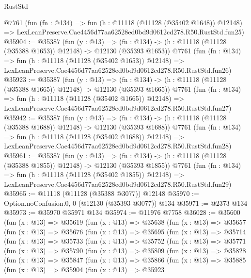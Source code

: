 \begin{lexlean}{RustStd}
\begin{coremodule}
    @7761
    (fun (fn : @134) =>
    fun (h : @11118 (@11128 (@35402 @1648)) @12148) =>
    LexLeanPreserve.Cae4456d77aa62528ed0bd9d0612cd278.R50.RustStd.fun25)
@35904 := @35387
    (fun (y : @13) =>
    (fn : @134) -> (h : @11118 (@11128 (@35388 @1653)) @12148) -> @12130 (@35393 @1653))
    @7761
    (fun (fn : @134) =>
    fun (h : @11118 (@11128 (@35402 @1653)) @12148) =>
    LexLeanPreserve.Cae4456d77aa62528ed0bd9d0612cd278.R50.RustStd.fun26)
@35923 := @35387
    (fun (y : @13) =>
    (fn : @134) -> (h : @11118 (@11128 (@35388 @1665)) @12148) -> @12130 (@35393 @1665))
    @7761
    (fun (fn : @134) =>
    fun (h : @11118 (@11128 (@35402 @1665)) @12148) =>
    LexLeanPreserve.Cae4456d77aa62528ed0bd9d0612cd278.R50.RustStd.fun27)
@35942 := @35387
    (fun (y : @13) =>
    (fn : @134) -> (h : @11118 (@11128 (@35388 @1688)) @12148) -> @12130 (@35393 @1688))
    @7761
    (fun (fn : @134) =>
    fun (h : @11118 (@11128 (@35402 @1688)) @12148) =>
    LexLeanPreserve.Cae4456d77aa62528ed0bd9d0612cd278.R50.RustStd.fun28)
@35961 := @35387
    (fun (y : @13) =>
    (fn : @134) -> (h : @11118 (@11128 (@35388 @1855)) @12148) -> @12130 (@35393 @1855))
    @7761
    (fun (fn : @134) =>
    fun (h : @11118 (@11128 (@35402 @1855)) @12148) =>
    LexLeanPreserve.Cae4456d77aa62528ed0bd9d0612cd278.R50.RustStd.fun29)
@35965 := @11118 (@11128 (@35388 @3077)) @12148
@35970 := Option.noConfusion.{0, 0} (@12130 (@35393 @3077)) @134
@35971 := @2373 @134
@35973 := @35970 @35971 @134
@35974 := @11976 @7758
@36028 := @35600
    (fun (x : @13) =>
    @35619
      (fun (x : @13) =>
      @35638
        (fun (x : @13) =>
        @35657
          (fun (x : @13) =>
          @35676
            (fun (x : @13) =>
            @35695
              (fun (x : @13) =>
              @35714
                (fun (x : @13) =>
                @35733
                  (fun (x : @13) =>
                  @35752
                    (fun (x : @13) =>
                    @35771
                      (fun (x : @13) =>
                      @35790
                        (fun (x : @13) =>
                        @35809
                          (fun (x : @13) =>
                          @35828
                            (fun (x : @13) =>
                            @35847
                              (fun (x : @13) =>
                              @35866
                                (fun (x : @13) =>
                                @35885
                                  (fun (x : @13) =>
                                  @35904
                                    (fun (x : @13) =>
                                    @35923

\end{coremodule}
\end{lexlean}
